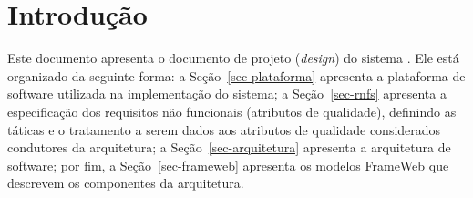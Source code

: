 \chapter{Introdução}
\label{sec-intro}
\vspace{-1cm}

Este documento apresenta o documento de projeto (\textit{design}) do sistema \emph{\imprimirtitulo}. Ele está organizado da seguinte forma: 
a Seção~\ref{sec-plataforma} apresenta a plataforma de software utilizada na implementação do sistema;
a Seção~\ref{sec-rnfs} apresenta a especificação dos requisitos não funcionais (atributos de qualidade), definindo as táticas e o tratamento a serem dados aos atributos de qualidade considerados condutores da arquitetura; 
a Seção~\ref{sec-arquitetura} apresenta a arquitetura de software; por fim, 
a Seção~\ref{sec-frameweb} apresenta os modelos FrameWeb que descrevem os componentes da arquitetura.

